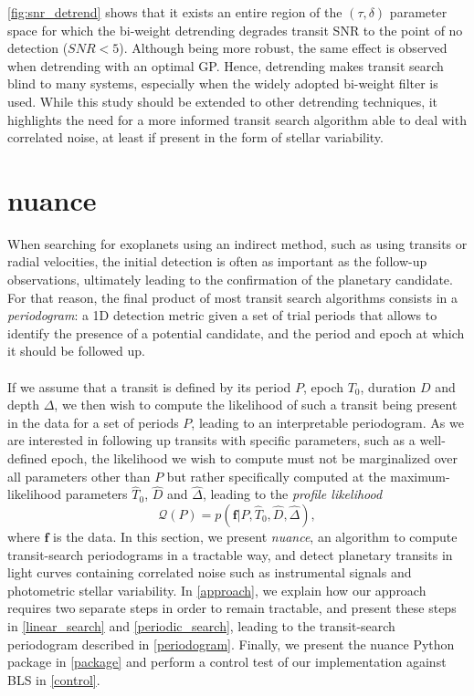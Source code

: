 \documentclass[modern]{aastex631}
\newcommand{\nuancecode}{\textsf{nuance}}
\begin{document}
\autoref{fig:snr_detrend} shows that it exists an entire region of the $(\tau, \delta)$ parameter space for which the bi-weight detrending degrades transit SNR to the point of no detection ($SNR < 5$). Although being more robust, the same effect is observed when detrending with an optimal GP. Hence, detrending makes transit search blind to many systems, especially when the widely adopted bi-weight filter is used. While this study should be extended to other detrending techniques, it highlights the need for a more informed transit search algorithm able to deal with correlated noise, at least if present in the form of stellar variability.

\newpage
\section{\textsf{nuance}}\label{nuance}
When searching for exoplanets using an indirect method, such as using transits or radial velocities, the initial detection is often as important as the follow-up observations, ultimately leading to the confirmation of the planetary candidate. For that reason, the final product of most transit search algorithms consists in a \textit{periodogram}: a 1D detection metric given a set of trial periods that allows to identify the presence of a potential candidate, and the period and epoch at which it should be followed up.\\\\ 
If we assume that a transit is defined by its period $P$, epoch $T_0$, duration $D$ and depth $\Delta$, we then wish to compute the likelihood of such a transit being present in the data for a set of periods $P$, leading to an interpretable periodogram. As we are interested in following up transits with specific parameters, such as a well-defined epoch, the likelihood we wish to compute must not be marginalized over all parameters other than $P$ but rather specifically computed at the maximum-likelihood parameters $\hat T_0$, $\hat D$ and $\hat \Delta$, leading to the \textit{profile likelihood}
\begin{equation}\label{eq:periodogram}
       \mathcal{Q}(P) = p(\bm{f} \vert P, \hat T_0 ,\hat D, \hat \Delta),
\end{equation} 
where $\bm{f}$ is the data. In this section, we present \textit{nuance}, an algorithm to compute transit-search periodograms in a tractable way, and detect planetary transits in light curves containing correlated noise such as instrumental signals and photometric stellar variability. In \autoref{approach}, we explain how our approach requires two separate steps in order to remain tractable, and present these steps in \autoref{linear_search} and \autoref{periodic_search}, leading to the transit-search periodogram described in \autoref{periodogram}. Finally, we present the \nuancecode{} Python package in \autoref{package} and perform a control test of our implementation against \textsf{BLS} in \autoref{control}.
\end{document}

